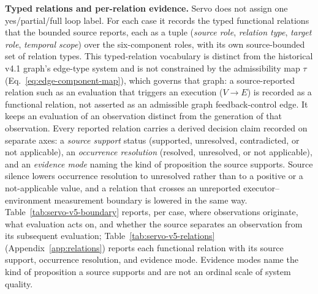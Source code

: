 \documentclass{article}
\begin{document}
\noindent\textbf{Typed relations and per-relation evidence.}
Servo does not assign one yes/partial/full loop label. For each case it records the typed
functional relations that the bounded source reports, each as a tuple (\emph{source role},
\emph{relation type}, \emph{target role}, \emph{temporal scope}) over the six-component roles,
with its own source-bounded set of relation types. This typed-relation vocabulary is distinct
from the historical v4.1 graph's edge-type system and is not constrained by the admissibility
map $\tau$ (Eq.~\ref{eq:edge-component-map}), which governs that graph: a source-reported
relation such as an evaluation that triggers an execution ($V\rightarrow E$) is recorded as a
functional relation, not asserted as an admissible graph feedback-control edge. It keeps an
evaluation of an observation distinct from the generation of that observation. Every reported relation carries a derived decision claim
recorded on separate axes: a \emph{source support} status (supported, unresolved, contradicted,
or not applicable), an \emph{occurrence resolution} (resolved, unresolved, or not applicable),
and an \emph{evidence mode} naming the kind of proposition the source supports. Source silence
lowers occurrence resolution to unresolved rather than to a positive or a not-applicable value,
and a relation that crosses an unreported executor--environment measurement boundary is lowered
in the same way. Table~\ref{tab:servo-v5-boundary} reports, per case, where observations
originate, what evaluation acts on, and whether the source separates an observation from its
subsequent evaluation; Table~\ref{tab:servo-v5-relations} (Appendix~\ref{app:relations}) reports
each functional relation with its source support, occurrence resolution, and evidence mode.
Evidence modes name the kind of proposition a source supports and are not an ordinal scale of
system quality.
\end{document}
